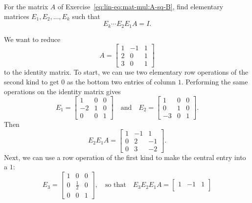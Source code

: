  For the matrix $A$ of
Exercise~\ref{eq:lin-eq:mat-mul:A-sq-B}, find elementary matrices
$E_1, E_2, \dots, E_k$ such that
\begin{equation*}
  E_k\cdots E_2E_1A = I.
\end{equation*}
\begin{solution}
  We want to reduce
  \begin{equation*}
    A =
    \begin{bmatrix}
      1 & -1 & 1 \\
      2 & 0 & 1 \\
      3 & 0 & 1
    \end{bmatrix}
  \end{equation*}
  to the identity matrix. To start, we can use two elementary row
  operations of the second kind to get $0$ as the bottom two entries
  of column $1$. Performing the same operations on the identity matrix
  gives
  \begin{equation*}
    E_1 =
    \begin{bmatrix}
      1 & 0 & 0 \\
      -2 & 1 & 0 \\
      0 & 0 & 1
    \end{bmatrix}
    \quad\text{and}\quad
    E_2 =
    \begin{bmatrix}
      1 & 0 & 0 \\
      0 & 1 & 0 \\
      -3 & 0 & 1
    \end{bmatrix}.
  \end{equation*}
  Then
  \begin{equation*}
    E_2E_1A =
    \begin{bmatrix}
      1 & -1 & 1 \\
      0 & 2 & -1 \\
      0 & 3 & -2
    \end{bmatrix}.
  \end{equation*}
  Next, we can use a row operation of the first kind to make the
  central entry into a $1$:
  \begin{equation*}
    E_3 =
    \begin{bmatrix}
      1 & 0 & 0 \\[3pt]
      0 & \frac12 & 0 \\[3pt]
      0 & 0 & 1
    \end{bmatrix},
    \quad\text{so that}\quad
    E_3E_2E_1A =
    \begin{bmatrix}
      1 & -1 & 1 \\[3pt]

\end{bmatrix}
\end{equation*}
\end{solution}
